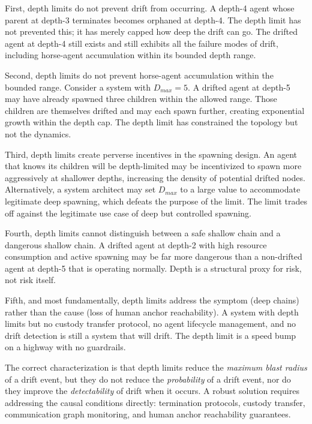 First, depth limits do not prevent drift from occurring. A depth-4 agent whose parent at depth-3 terminates becomes orphaned at depth-4. The depth limit has not prevented this; it has merely capped how deep the drift can go. The drifted agent at depth-4 still exists and still exhibits all the failure modes of drift, including horse-agent accumulation within its bounded depth range.

Second, depth limits do not prevent horse-agent accumulation within the bounded range. Consider a system with $D_{max} = 5$. A drifted agent at depth-5 may have already spawned three children within the allowed range. Those children are themselves drifted and may each spawn further, creating exponential growth within the depth cap. The depth limit has constrained the topology but not the dynamics.

Third, depth limits create perverse incentives in the spawning design. An agent that knows its children will be depth-limited may be incentivized to spawn more aggressively at shallower depths, increasing the density of potential drifted nodes. Alternatively, a system architect may set $D_{max}$ to a large value to accommodate legitimate deep spawning, which defeats the purpose of the limit. The limit trades off against the legitimate use case of deep but controlled spawning.

Fourth, depth limits cannot distinguish between a safe shallow chain and a dangerous shallow chain. A drifted agent at depth-2 with high resource consumption and active spawning may be far more dangerous than a non-drifted agent at depth-5 that is operating normally. Depth is a structural proxy for risk, not risk itself.

Fifth, and most fundamentally, depth limits address the symptom (deep chains) rather than the cause (loss of human anchor reachability). A system with depth limits but no custody transfer protocol, no agent lifecycle management, and no drift detection is still a system that will drift. The depth limit is a speed bump on a highway with no guardrails.

The correct characterization is that depth limits reduce the \textit{maximum blast radius} of a drift event, but they do not reduce the \textit{probability} of a drift event, nor do they improve the \textit{detectability} of drift when it occurs. A robust solution requires addressing the causal conditions directly: termination protocols, custody transfer, communication graph monitoring, and human anchor reachability guarantees.


